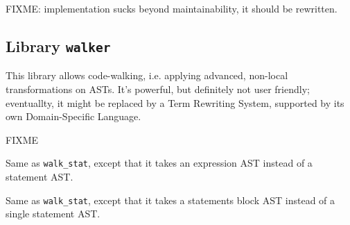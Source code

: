 FIXME: implementation sucks beyond maintainability, it should be
rewritten.

\subsection{Library {\tt walker}}
This library allows code-walking, i.e. applying advanced, non-local 
transformations on ASTs. It's powerful, but definitely not user
friendly; eventuallty, it might be replaced by a Term Rewriting
System, supported by its own Domain-Specific Language.

FIXME


Same as {\tt walk\_stat}, except that it takes an expression AST
instead of a statement AST. 

Same as {\tt walk\_stat}, except that it takes a statements block AST
instead of a single statement AST.
